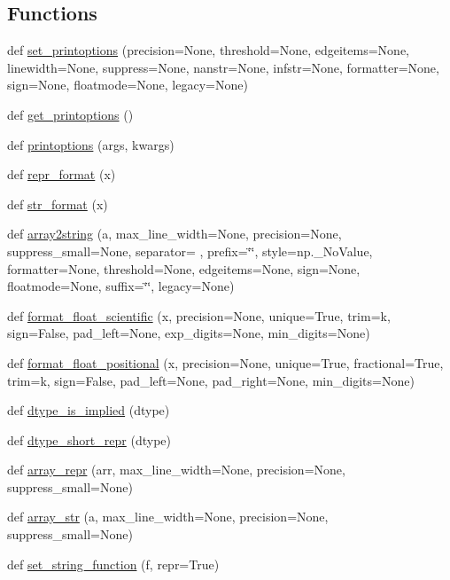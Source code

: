 \subsection*{Functions}
\begin{DoxyCompactItemize}
\item 
def \hyperlink{namespacenumpy_1_1core_1_1arrayprint_a16c960f486a3a0cf4a3c83a0dbc18503}{set\+\_\+printoptions} (precision=None, threshold=None, edgeitems=None, linewidth=None, suppress=None, nanstr=None, infstr=None, formatter=None, sign=None, floatmode=None, legacy=None)
\item 
def \hyperlink{namespacenumpy_1_1core_1_1arrayprint_a65ecafa0dff7c492f6c9cc854f3e25f5}{get\+\_\+printoptions} ()
\item 
def \hyperlink{namespacenumpy_1_1core_1_1arrayprint_a72c3329c103e1188af0d0a3927274321}{printoptions} (args, kwargs)
\item 
def \hyperlink{namespacenumpy_1_1core_1_1arrayprint_ae4f6d86caeb40ebd108226ac39bc65d1}{repr\+\_\+format} (x)
\item 
def \hyperlink{namespacenumpy_1_1core_1_1arrayprint_a9c25606ff694dc48b0e45ebef848025a}{str\+\_\+format} (x)
\item 
def \hyperlink{namespacenumpy_1_1core_1_1arrayprint_a0460bad6747319f766bf7ceb8f40e593}{array2string} (a, max\+\_\+line\+\_\+width=None, precision=None, suppress\+\_\+small=None, separator=\textquotesingle{} \textquotesingle{}, prefix=\char`\"{}\char`\"{}, style=np.\+\_\+\+No\+Value, formatter=None, threshold=None, edgeitems=None, sign=None, floatmode=None, suffix=\char`\"{}\char`\"{}, legacy=None)
\item 
def \hyperlink{namespacenumpy_1_1core_1_1arrayprint_a2cea445365c52268e6a9ff8e31fab046}{format\+\_\+float\+\_\+scientific} (x, precision=None, unique=True, trim=\textquotesingle{}k\textquotesingle{}, sign=False, pad\+\_\+left=None, exp\+\_\+digits=None, min\+\_\+digits=None)
\item 
def \hyperlink{namespacenumpy_1_1core_1_1arrayprint_a8a77078d071937fb9e895ab6b86bc09c}{format\+\_\+float\+\_\+positional} (x, precision=None, unique=True, fractional=True, trim=\textquotesingle{}k\textquotesingle{}, sign=False, pad\+\_\+left=None, pad\+\_\+right=None, min\+\_\+digits=None)
\item 
def \hyperlink{namespacenumpy_1_1core_1_1arrayprint_a630f2590107cb2c3416fa8a554e2ff1d}{dtype\+\_\+is\+\_\+implied} (dtype)
\item 
def \hyperlink{namespacenumpy_1_1core_1_1arrayprint_ab37467384567a1961f85f1ccf0e92d31}{dtype\+\_\+short\+\_\+repr} (dtype)
\item 
def \hyperlink{namespacenumpy_1_1core_1_1arrayprint_a7d6c2ed788c3217b2d148088525cf38f}{array\+\_\+repr} (arr, max\+\_\+line\+\_\+width=None, precision=None, suppress\+\_\+small=None)
\item 
def \hyperlink{namespacenumpy_1_1core_1_1arrayprint_a4e8029365da7c199289976fcae0e8af8}{array\+\_\+str} (a, max\+\_\+line\+\_\+width=None, precision=None, suppress\+\_\+small=None)
\item 
def \hyperlink{namespacenumpy_1_1core_1_1arrayprint_aa93ad4b5a722166e031bbf5066a2fefe}{set\+\_\+string\+\_\+function} (f, repr=True)
\end{DoxyCompactItemize}
